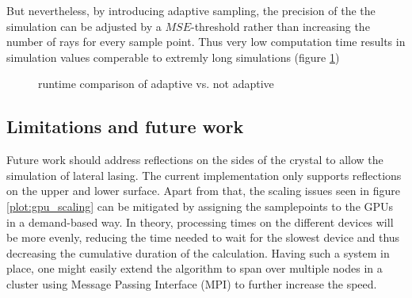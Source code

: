 But nevertheless, by introducing adaptive sampling, the precision of the the simulation
can be adjusted by a $MSE$-threshold rather than increasing the number
of rays for every sample point. Thus very low computation time results in
simulation values comperable to extremly long simulations (figure \ref{plot:adaptive_runtime})\\
\begin{figure}[H]
  \centerline{
    }
  \caption{runtime comparison of adaptive vs. not adaptive }
  \label{plot:adaptive_runtime}
\end{figure}

\subsection{Limitations and future work}
\label{subsec:limitations}

Future work should address reflections on the sides of the crystal to allow the
simulation of lateral lasing. The current implementation only supports
reflections on the upper and lower surface.
Apart from that, the scaling issues seen in figure \ref{plot:gpu_scaling} can be
mitigated by assigning the samplepoints to the GPUs in a demand-based way.  In
theory, processing times on the different devices will be more evenly, reducing
the time needed to wait for the slowest device and thus decreasing the
cumulative duration of the calculation. Having such a system in place, one might
easily extend the algorithm to span over multiple nodes in a cluster using
Message Passing Interface (MPI)\cite{MPI} to further increase the speed.


